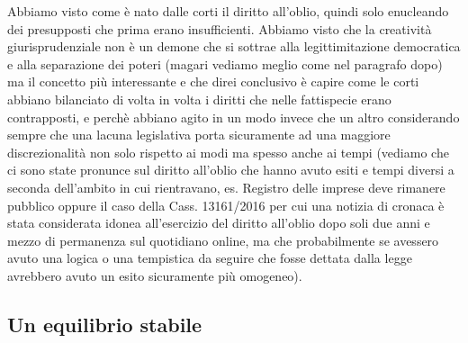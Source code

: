 Abbiamo visto come è nato dalle corti il diritto all'oblio, quindi solo enucleando dei presupposti che prima erano insufficienti. Abbiamo visto che la creatività giurisprudenziale non è un demone che si sottrae alla legittimitazione democratica e alla separazione dei poteri (magari vediamo meglio come nel paragrafo dopo) ma il concetto più interessante e che direi conclusivo è capire come le corti abbiano bilanciato di volta in volta i diritti che nelle fattispecie erano contrapposti, e perchè abbiano agito in un modo invece che un altro considerando sempre che una lacuna legislativa porta sicuramente ad una maggiore discrezionalità non solo rispetto ai modi ma spesso anche ai tempi (vediamo che ci sono state pronunce sul diritto all'oblio che hanno avuto esiti e tempi diversi a seconda dell'ambito in cui rientravano, es. Registro delle imprese deve rimanere pubblico oppure il caso della Cass. 13161/2016 per cui una notizia di cronaca è stata considerata idonea all'esercizio del diritto all'oblio dopo soli due anni e mezzo di permanenza sul quotidiano online, ma che probabilmente se avessero avuto una logica o una tempistica da seguire che fosse dettata dalla legge avrebbero avuto un esito sicuramente più omogeneo).


\subsection{Un equilibrio stabile}

